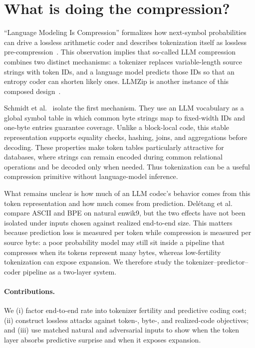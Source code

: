 \documentclass{article}
\begin{document}
\section{What is doing the compression?}
``Language Modeling Is Compression'' formalizes how next-symbol probabilities
can drive a lossless arithmetic coder and describes tokenization itself as
lossless pre-compression~\citep{deletang2024language}. This observation implies
that so-called LLM compression combines two distinct mechanisms: a tokenizer
replaces variable-length source strings with token IDs, and a language model
predicts those IDs so that an entropy coder can shorten likely ones. LLMZip is
another instance of this composed design~\citep{valmeekam2023llmzip}.

Schmidt et al.~\citep{schmidt2026token} isolate the first mechanism. They use an
LLM vocabulary as a global symbol table in which common byte strings map to
fixed-width IDs and one-byte entries guarantee coverage. Unlike a block-local
code, this stable representation supports equality checks, hashing, joins, and
aggregations before decoding. These properties make token tables particularly
attractive for databases, where strings can remain encoded during common
relational operations and be decoded only when needed. Thus tokenization can be
a useful compression primitive without language-model inference.

What remains unclear is how much of an LLM codec's behavior comes from this
token representation and how much comes from prediction. Delétang et al. compare
ASCII and BPE on natural enwik9, but the two effects have not been isolated under
inputs chosen against realized end-to-end size. This matters because prediction
loss is measured per token while compression is measured per source byte: a poor
probability model may still sit inside a pipeline that compresses when its tokens
represent many bytes, whereas low-fertility tokenization can expose expansion.
We therefore study the tokenizer--predictor--coder pipeline as a two-layer system.

\paragraph{Contributions.}
We (i) factor end-to-end rate into tokenizer fertility and predictive coding
cost; (ii) construct lossless attacks against token-, byte-, and realized-code
objectives; and (iii) use matched natural and adversarial inputs to show when the
token layer absorbs predictive surprise and when it exposes expansion.
\end{document}
